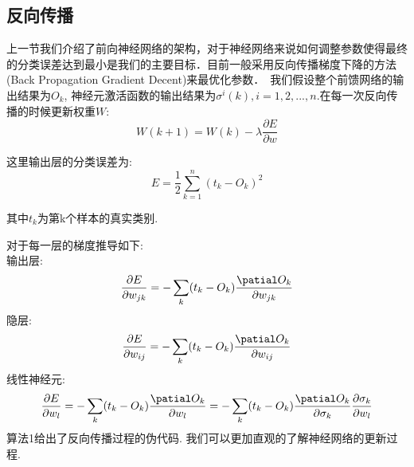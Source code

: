 \documentclass[12pt]{article}
\begin{document}
\begin{CJK*}{UTF8}{gbsn}
{\subsection{反向传播}

上一节我们介绍了前向神经网络的架构，对于神经网络来说如何调整参数使得最终的分类误差达到最小是我们的主要目标．目前一般采用反向传播梯度下降的方法(Back Propagation Gradient Decent)来最优化参数．　我们假设整个前馈网络的输出结果为$O_k$,     神经元激活函数的输出结果为$\sigma^i(k),    i =1 ,    2,    ...,    n$.在每一次反向传播的时候更新权重$W$:
\begin{equation}
    W(k+1) = W(k) -\lambda \frac{\partial E}{\partial w}
\end{equation}

这里输出层的分类误差为: 
\begin{equation}
    E=\frac{1}{2} \sum_{k=1}^{n}(t_k-O_k)^2
\end{equation}

其中$t_k$为第k个样本的真实类别.

对于每一层的梯度推导如下:\\
输出层:
\begin{equation}
 \frac{\partial E}{\partial w_{jk}}=-\sum_k(t_k-O_k)\frac{\patial O_k}{\partial w_{jk}}
\end{equation}
隐层:
\begin{equation}
 \frac{\partial E}{\partial w_{ij}}=-\sum_k(t_k-O_k)\frac{\patial O_k}{\partial w_{ij}}
\end{equation}
线性神经元:
\begin{equation}
 \frac{\partial E}{\partial w_{l}}=-\sum_k(t_k-O_k)\frac{\patial O_k}{\partial w_{l}}=-\sum_k(t_k-O_k)\frac{\patial O_k}{\partial \sigma_k}\frac{\partial \sigma_k}{\partial w_l}
\end{equation}
算法1给出了反向传播过程的伪代码. 我们可以更加直观的了解神经网络的更新过程.

}
\end{CJK*}
\end{document}
